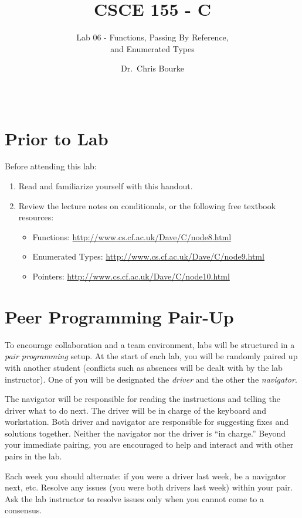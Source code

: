 \documentclass[12pt]{scrartcl}
\title{CSCE 155 - C}
\subtitle{Lab 06 - Functions, Passing By Reference,\\ and Enumerated Types}
\author{Dr.\ Chris Bourke}
\date{~}
\begin{document}
\maketitle

\section*{Prior to Lab}

Before attending this lab:
\begin{enumerate}
  \item Read and familiarize yourself with this handout.
  \item Review the lecture notes on conditionals, or the following free textbook resources:
	\begin{itemize}
  	  \item Functions: \url{http://www.cs.cf.ac.uk/Dave/C/node8.html}
	  \item Enumerated Types: \url{http://www.cs.cf.ac.uk/Dave/C/node9.html}
	  \item Pointers: \url{http://www.cs.cf.ac.uk/Dave/C/node10.html}
	\end{itemize}
\end{enumerate}

\section*{Peer Programming Pair-Up}

To encourage collaboration and a team environment, labs will be
structured in a \emph{pair programming} setup.  At the start of
each lab, you will be randomly paired up with another student 
(conflicts such as absences will be dealt with by the lab instructor).
One of you will be designated the \emph{driver} and the other
the \emph{navigator}.  

The navigator will be responsible for reading the instructions and
telling the driver what to do next.  The driver will be in charge of the
keyboard and workstation.  Both driver and navigator are responsible
for suggesting fixes and solutions together.  Neither the navigator
nor the driver is ``in charge.''  Beyond your immediate pairing, you
are encouraged to help and interact and with other pairs in the lab.

Each week you should alternate: if you were a driver last week, 
be a navigator next, etc.  Resolve any issues (you were both drivers
last week) within your pair.  Ask the lab instructor to resolve issues
only when you cannot come to a consensus.  
\end{document}
